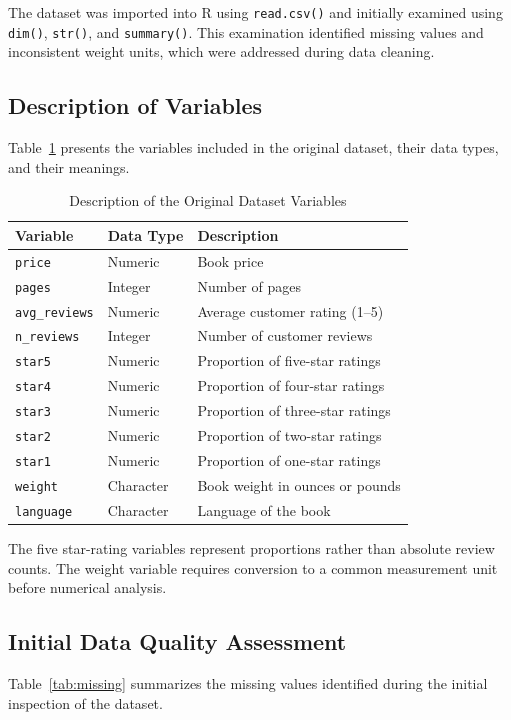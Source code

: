 \documentclass[11pt,a4paper]{article}
\begin{document}
The dataset was imported into R using \texttt{read.csv()}
and initially examined using \texttt{dim()}, \texttt{str()},
and \texttt{summary()}. This examination identified missing
values and inconsistent weight units, which were addressed
during data cleaning.
\subsection{Description of Variables}
Table~\ref{tab:variables} presents the variables included
in the original dataset, their data types, and their meanings.
\begin{table}[H]
\centering
\small
\begin{tabular}{lll}
\toprule
Variable & Data Type & Description \\
\midrule
\texttt{price} & Numeric & Book price \\
\texttt{pages} & Integer & Number of pages \\
\texttt{avg\_reviews} & Numeric & Average customer rating (1--5) \\
\texttt{n\_reviews} & Integer & Number of customer reviews \\
\texttt{star5} & Numeric & Proportion of five-star ratings \\
\texttt{star4} & Numeric & Proportion of four-star ratings \\
\texttt{star3} & Numeric & Proportion of three-star ratings \\
\texttt{star2} & Numeric & Proportion of two-star ratings \\
\texttt{star1} & Numeric & Proportion of one-star ratings \\
\texttt{weight} & Character & Book weight in ounces or pounds \\
\texttt{language} & Character & Language of the book \\
\bottomrule
\end{tabular}
\caption{Description of the Original Dataset Variables}
\label{tab:variables}
\end{table}
The five star-rating variables represent proportions rather
than absolute review counts. The weight variable requires
conversion to a common measurement unit before numerical analysis.
\subsection{Initial Data Quality Assessment}
Table~\ref{tab:missing} summarizes the missing values
identified during the initial inspection of the dataset.
\end{document}
